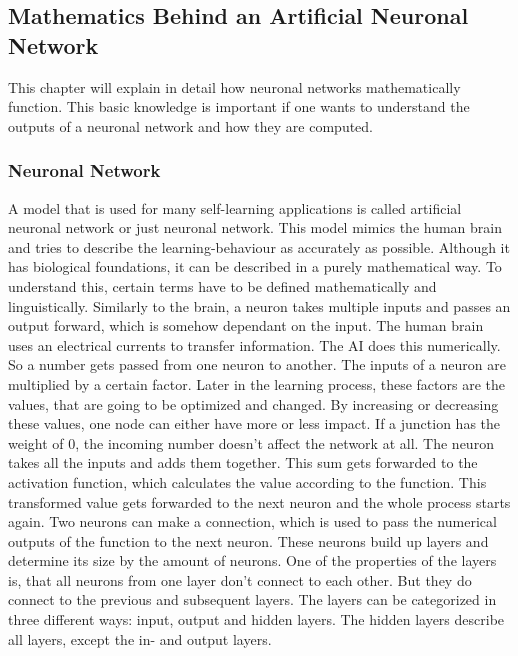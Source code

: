 \documentclass[12pt]{article}
\begin{document}
\subsection{Mathematics Behind an Artificial Neuronal Network}
This chapter will explain in detail how neuronal networks mathematically function. This basic knowledge is important if one wants to understand the outputs of a \gls{neuronal network} and how they are computed.
\subsubsection{Neuronal Network}\label{sec:nnmath}
A model that is used for many self-learning applications is called artificial \gls{neuronal network} or just  \gls{neuronal network}. This model mimics the human brain and tries to describe the learning-behaviour as accurately as possible. Although it has biological foundations, it can be described in a purely mathematical way. To understand this, certain terms have to be defined mathematically and linguistically.
Similarly to the brain, a \gls{neuron} takes multiple  \glspl{input} and passes an output forward, which is somehow dependant on the  \gls{input}. The human brain uses an electrical currents to transfer information. The \gls{AI} does this numerically. So a number gets passed from one neuron to another. The \glspl{input} of a \gls{neuron} are multiplied by a certain factor. Later in the learning process, these factors are the values, that are going to be optimized and changed. By increasing or decreasing these values, one node can either have more or less impact. If a junction has the \gls{weight} of $0$, the incoming number doesn't affect the network at all. The \gls{neuron} takes all the \glspl{input} and adds them together. This sum gets forwarded to the \gls{activation function}, which calculates the value according to the function. This transformed value gets forwarded to the next neuron and the whole process starts again. Two \glspl{neuron} can make a connection, which is used to pass the numerical \glspl{output} of the function to the next neuron. These \glspl{neuron} build up \glspl{layer} and determine its size by the amount of \glspl{neuron}. One of the properties of the  \glspl{layer} is, that all \glspl{neuron} from one \gls{layer} don't connect to each other. But they do connect to the previous and subsequent \glspl{layer}. The \glspl{layer} can be categorized in three different ways:  \gls{input}, output and \glspl{hidden layer}. The hidden \glspl{layer} describe all \glspl{layer}, except the in- and \glspl{output layer}. \cite{neuronal_network}\\
\end{document}
